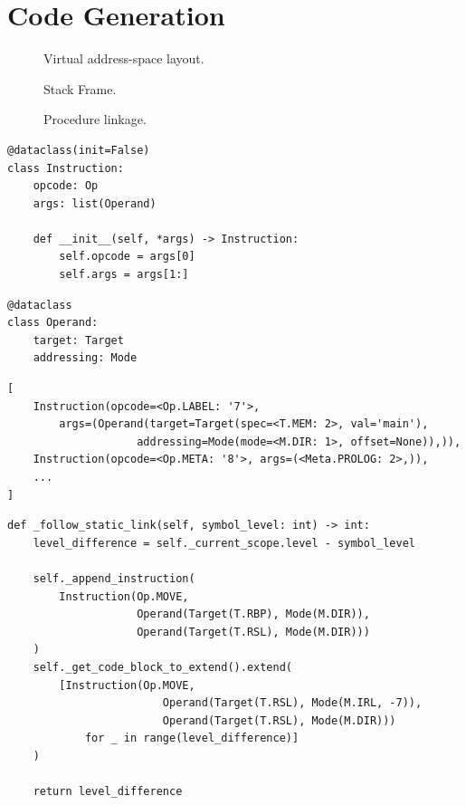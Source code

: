 \newpage

\section{Code Generation} \label{sec:code-gen}
\cite{ModernCompilerImplementation}

\begin{figure}[H]
    \centering
    
    \caption{Virtual address-space layout.} 
    \label{fig:address_space}
\end{figure}

\begin{figure}[H]
    \centering
    
    \caption{Stack Frame.} 
    \label{fig:stack}
\end{figure}

\begin{figure}[H]
    \centering
    
    \caption{Procedure linkage.} 
    \label{fig:procedure}
\end{figure}

\begin{verbatim}
@dataclass(init=False)
class Instruction:
    opcode: Op
    args: list(Operand)

    def __init__(self, *args) -> Instruction:
        self.opcode = args[0]
        self.args = args[1:]
\end{verbatim}

\begin{verbatim}
@dataclass
class Operand:
    target: Target
    addressing: Mode
\end{verbatim}

\begin{verbatim}
[
    Instruction(opcode=<Op.LABEL: '7'>,
        args=(Operand(target=Target(spec=<T.MEM: 2>, val='main'),
                    addressing=Mode(mode=<M.DIR: 1>, offset=None)),)),
    Instruction(opcode=<Op.META: '8'>, args=(<Meta.PROLOG: 2>,)),
    ...
]
\end{verbatim}

\begin{verbatim}
def _follow_static_link(self, symbol_level: int) -> int:
    level_difference = self._current_scope.level - symbol_level

    self._append_instruction(
        Instruction(Op.MOVE,
                    Operand(Target(T.RBP), Mode(M.DIR)),
                    Operand(Target(T.RSL), Mode(M.DIR)))
    )
    self._get_code_block_to_extend().extend(
        [Instruction(Op.MOVE,
                        Operand(Target(T.RSL), Mode(M.IRL, -7)),
                        Operand(Target(T.RSL), Mode(M.DIR)))
            for _ in range(level_difference)]
    )

    return level_difference
\end{verbatim}

